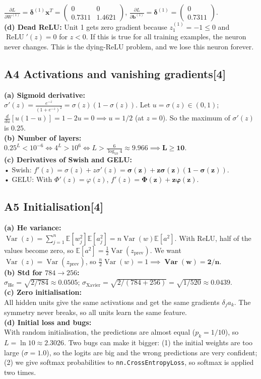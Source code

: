 \documentclass[conference,a4paper]{IEEEtran}
\newcommand{\task}[2]{\subsection{#1\hfill[#2]}}
\begin{document}
$\frac{\partial L}{\partial W^{(1)}} = \boldsymbol\delta^{(1)}\mathbf{x}^T = \begin{pmatrix}0 & 0\\0.7311 & 1.4621\end{pmatrix}$, \quad
$\frac{\partial L}{\partial \mathbf{b}^{(1)}} = \boldsymbol\delta^{(1)} = \begin{pmatrix}0\\0.7311\end{pmatrix}$.\\[2pt]
\textbf{(d) Dead ReLU:}
Unit 1 gets zero gradient because $z_1^{(1)} = -1 \le 0$ and $\operatorname{ReLU}'(z)=0$ for $z<0$. If this is true for all training examples, the neuron never changes. This is the dying-ReLU problem, and we lose this neuron forever.

\task{A4 Activations and vanishing gradients}{4}
\textbf{(a) Sigmoid derivative:}\\
$\sigma'(z) = \frac{e^{-z}}{(1+e^{-z})^2} = \sigma(z)(1-\sigma(z))$. Let $u=\sigma(z)\in(0,1)$; $\frac{d}{du}[u(1-u)] = 1-2u=0 \implies u=1/2$ (at $z=0$). So the maximum of $\sigma'(z)$ is $\mathbf{0.25}$.\\[2pt]
\textbf{(b) Number of layers:}\\
$0.25^L < 10^{-6} \iff 4^L > 10^6 \iff L > \frac{6}{\log_{10} 4} \approx 9.966 \implies \mathbf{L \ge 10}$.\\[2pt]
\textbf{(c) Derivatives of Swish and GELU:}\\
• Swish: $f'(z) = \sigma(z) + z\sigma'(z) = \mathbf{\sigma(z) + z\sigma(z)(1-\sigma(z))}$.\\
• GELU: With $\Phi'(z) = \varphi(z)$, $f'(z) = \mathbf{\Phi(z) + z\varphi(z)}$.

\task{A5 Initialisation}{4}
\textbf{(a) He variance:}\\
$\operatorname{Var}(z) = \sum_{j=1}^n \mathbb{E}[w_j^2]\mathbb{E}[a_j^2] = n\operatorname{Var}(w)\mathbb{E}[a^2]$. With ReLU, half of the values become zero, so $\mathbb{E}[a^2] = \frac{1}{2}\operatorname{Var}(z_{\text{prev}})$.
We want $\operatorname{Var}(z)=\operatorname{Var}(z_{\text{prev}})$, so $\frac{n}{2}\operatorname{Var}(w)=1 \implies \mathbf{\operatorname{Var}(w)=2/n}$.\\[2pt]
\textbf{(b) Std for $784\to256$:}\\
$\sigma_{\text{He}} = \sqrt{2/784} \approx \mathbf{0.0505}$; \quad
$\sigma_{\text{Xavier}} = \sqrt{2/(784+256)} = \sqrt{1/520} \approx \mathbf{0.0439}$.\\[2pt]
\textbf{(c) Zero initialisation:}\\
All hidden units give the same activations and get the same gradients $\delta_j a_k$. The symmetry never breaks, so all units learn the same feature.\\[2pt]
\textbf{(d) Initial loss and bugs:}\\
With random initialisation, the predictions are almost equal ($p_k=1/10$), so $L = \ln 10 \approx \mathbf{2.3026}$.
Two bugs can make it bigger: (1) the initial weights are too large ($\sigma=1.0$), so the logits are big and the wrong predictions are very confident; (2) we give softmax probabilities to \texttt{nn.CrossEntropyLoss}, so softmax is applied two times.
\end{document}

